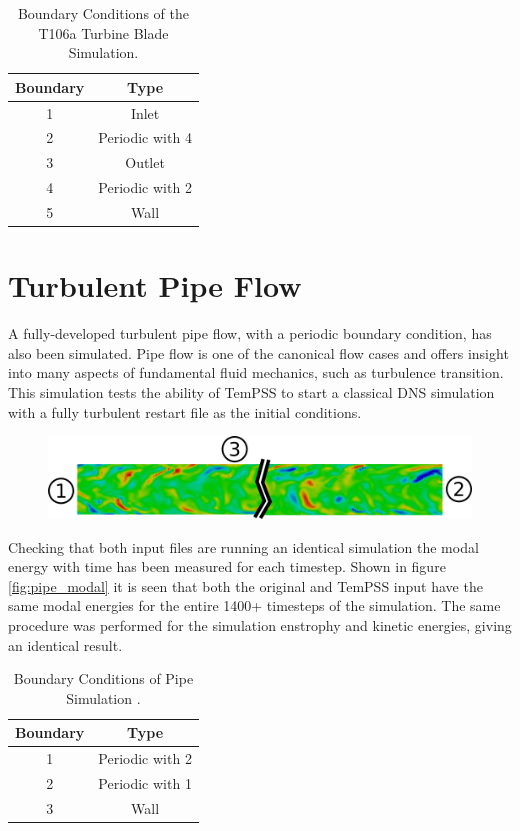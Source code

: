 \documentclass[11pt, a4paper]{report}
\begin{document}
\begin{table}[htb!]
	\centering
    \begin{tabular}{ c || c }
    \hline
    Boundary & Type \\
    \hline
    1 & Inlet \\
    2 & Periodic with 4\\
    3 & Outlet\\
    4 & Periodic with 2\\
    5 & Wall\\
    \hline
    \end{tabular}
    \caption{Boundary Conditions of the T106a Turbine Blade Simulation.}
    \label{tab:t106a_boundaries}
\end{table}


\section{Turbulent Pipe Flow}
A fully-developed turbulent pipe flow, with a periodic boundary condition, has also been simulated. Pipe flow is one of the canonical flow cases and offers insight into many aspects of fundamental fluid mechanics, such as turbulence transition. This simulation tests the ability of TemPSS to start a classical DNS simulation with a fully turbulent restart file as the initial conditions.

\begin{figure}[htb!]
 \centering
 \includegraphics[width=.95\linewidth,  clip=true, trim = 0cm 0cm 0cm 0cm]{pipe_domain_real}
 \label{fig:pipe_domain}
\end{figure}

Checking that both input files are running an identical simulation the modal energy with time has been measured for each timestep. Shown in figure \ref{fig:pipe_modal} it is seen that both the original and TemPSS input have the same modal energies for the entire 1400+ timesteps of the simulation. The same procedure was performed for the simulation enstrophy and kinetic energies, giving an identical result.

\begin{table}[htb!]
	\centering
    \begin{tabular}{ c || c }
    \hline
    Boundary & Type \\
    \hline
    1 & Periodic with 2 \\
    2 & Periodic with 1\\
    3 & Wall \\
    \hline
    \end{tabular}
    \caption{Boundary Conditions of Pipe Simulation	.}
    \label{tab:pipe_boundaries}
\end{table}
\end{document}
